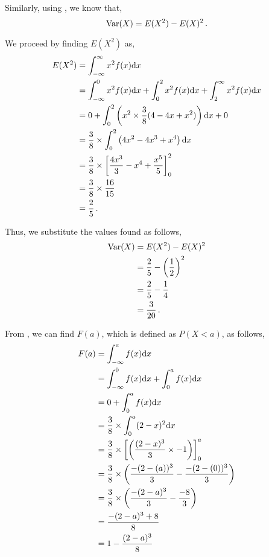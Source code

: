 \begin{subquestions}
\begin{subsubquestions}
Similarly, using , we know that,
\begin{equation}
  \text{Var}(X) = E(X^2)- E(X)^2 \,.
\end{equation}

We proceed by finding $E(X^2)$ as,
\begin{align}
  E(X^2) & = \int_{-\infty}^{\infty}x^2 f(x)\mathrm{d}x \nonumber \\
         & = \int_{-\infty}^{0}x^2 f(x)\mathrm{d}x+\int_{0}^{2}x^2 f(x)\mathrm{d}x+\int_{2}^{\infty}x^2 f(x)\mathrm{d}x \nonumber \\
         & = 0 + \int_{0}^{2} \left(x^2 \times \frac{3}{8}(4-4x+x^2)\right)\mathrm{d}x + 0 \nonumber \\
  		 & = \frac{3}{8} \times \int_{0}^{2} \left(4x^2-4x^3+x^4\right)\mathrm{d}x  \nonumber \\
  		 & = \frac{3}{8} \times \left[ \frac{4x^3}{3} - x^4 + \frac{x^5}{5}\right]_0^2  \nonumber \\
  		 & = \frac{3}{8} \times \frac{16}{15}\nonumber \\
  		 & = \frac{2}{5}\,.
\end{align}
  
 Thus, we substitute the values found as follows,
\begin{align}
  		\text{Var}(X) & = E(X^2)- E(X)^2 \nonumber \\
         & = \frac{2}{5} - \left(\frac{1}{2}\right)^2 \nonumber \\
         & = \frac{2}{5} - \frac{1}{4} \nonumber \\
         & = \frac{3}{20} \,.
\end{align}


\subsubquestion

From , we can find $F(a)$, which is defined as $P(X<a)$, as follows,
\begin{align}
	F(a) & = \int_{-\infty}^{a} f(x)\mathrm{d}x \nonumber \\
	     & = \int_{-\infty}^{0} f(x)\mathrm{d}x + \int_{0}^{a} f(x)\mathrm{d}x \nonumber \\
	     & = 0 + \int_{0}^{a} f(x)\mathrm{d}x \nonumber \\
	     & = \frac{3}{8} \times \int_{0}^{a} (2-x)^2\mathrm{d}x \nonumber \\
	     & = \frac{3}{8} \times \left[\left(\frac{(2-x)^3}{3} \times -1 \right) \right]_0^a \nonumber \\
	     & = \frac{3}{8} \times \left(\frac{-(2-(a))^3}{3} - \frac{-(2-(0))^3}{3}\right) \nonumber \\
	     & = \frac{3}{8} \times \left(\frac{-(2-a)^3}{3} - \frac{-8}{3}\right) \nonumber \\
	     & = \frac{-(2-a)^3 + 8}{8} \nonumber \\
	     & = 1 - \frac{(2-a)^3}{8}
\end{align}


\end{subsubquestions}
\end{subquestions}
